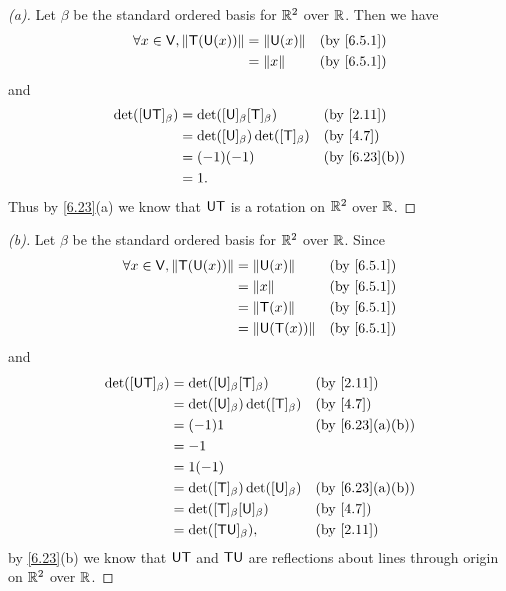 \begin{proof}[(a)]
  Let \(\beta\) be the standard ordered basis for \(\mathbb{R}^2\) over \(\mathbb{R}\).
  Then we have
  \begin{align*}
    \forall x \in \V, \norm{\T(\U(x))} & = \norm{\U(x)} &  & \by{6.5.1} \\
                                       & = \norm{x}     &  & \by{6.5.1}
  \end{align*}
  and
  \begin{align*}
    \det([\U \T]_{\beta}) & = \det([\U]_{\beta} [\T]_{\beta})       &  & \by{2.11}    \\
                          & = \det([\U]_{\beta}) \det([\T]_{\beta}) &  & \by{4.7}     \\
                          & = (-1) (-1)                             &  & \by{6.23}[b] \\
                          & = 1.
  \end{align*}
  Thus by \cref{6.23}(a) we know that \(\mathsf{U} \mathsf{T}\) is a rotation on \(\mathbb{R}^2\) over \(\mathbb{R}\).
\end{proof}

\begin{proof}[(b)]
  Let \(\beta\) be the standard ordered basis for \(\mathbb{R}^2\) over \(\mathbb{R}\).
  Since
  \begin{align*}
    \forall x \in \V, \norm{\T(\U(x))} & = \norm{\U(x)}     &  & \by{6.5.1} \\
                                       & = \norm{x}         &  & \by{6.5.1} \\
                                       & = \norm{\T(x)}     &  & \by{6.5.1} \\
                                       & = \norm{\U(\T(x))} &  & \by{6.5.1}
  \end{align*}
  and
  \begin{align*}
    \det([\U \T]_{\beta}) & = \det([\U]_{\beta} [\T]_{\beta})       &  & \by{2.11}      \\
                          & = \det([\U]_{\beta}) \det([\T]_{\beta}) &  & \by{4.7}       \\
                          & = (-1) 1                                &  & \by{6.23}[a,b] \\
                          & = -1                                                        \\
                          & = 1 (-1)                                                    \\
                          & = \det([\T]_{\beta}) \det([\U]_{\beta}) &  & \by{6.23}[a,b] \\
                          & = \det([\T]_{\beta} [\U]_{\beta})       &  & \by{4.7}       \\
                          & = \det([\T \U]_{\beta}),                &  & \by{2.11}
  \end{align*}
  by \cref{6.23}(b) we know that \(\mathsf{U} \mathsf{T}\) and \(\mathsf{T} \mathsf{U}\) are reflections about lines through origin on \(\mathbb{R}^2\) over \(\mathbb{R}\).
\end{proof}


